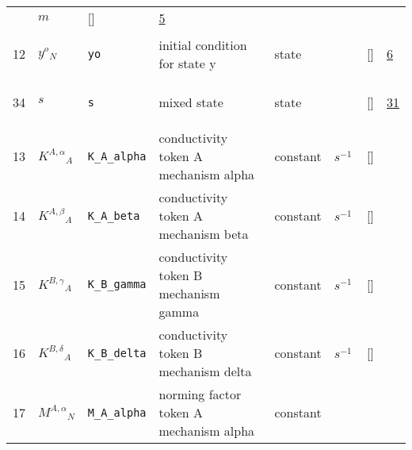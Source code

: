 \begin{longtable}{|p{1cm}|p{3cm}|p{3cm}|p{7cm}|p{3.0cm}|p{3cm}|p{2cm}|p{1cm}|}
             & $ m  $
             & []
             & \hyperlink{"e:5"}{ 5 }
                 \\
    12
             & \hypertarget{"v:12"}{ $ {{y^o}}{_{N}} $}
             & \verb|yo|
             & initial condition for state y
             & \begin{lay}state \end{lay}
             & $  $
             & []
             & \hyperlink{"e:6"}{ 6 }
                 \\
    34
             & \hypertarget{"v:34"}{ $ {s}{_{}} $}
             & \verb|s|
             & mixed state
             & \begin{lay}state \end{lay}
             & $  $
             & []
             & \hyperlink{"e:31"}{ 31 }
                 \\
    13
             & \hypertarget{"v:13"}{ $ {{K^{A,\alpha}}}{_{A}} $}
             & \verb|K_A_alpha|
             & conductivity token A mechanism alpha 
             & \begin{lay}constant \end{lay}
             & $ s^{-1} \, $
             & []
             & \\
    14
             & \hypertarget{"v:14"}{ $ {{K^{A,\beta}}}{_{A}} $}
             & \verb|K_A_beta|
             & conductivity token A mechanism beta
             & \begin{lay}constant \end{lay}
             & $ s^{-1} \, $
             & []
             & \\
    15
             & \hypertarget{"v:15"}{ $ {{K^{B,\gamma}}}{_{A}} $}
             & \verb|K_B_gamma|
             & conductivity token B mechanism gamma
             & \begin{lay}constant \end{lay}
             & $ s^{-1} \, $
             & []
             & \\
    16
             & \hypertarget{"v:16"}{ $ {{K^{B,\delta}}}{_{A}} $}
             & \verb|K_B_delta|
             & conductivity token B mechanism delta
             & \begin{lay}constant \end{lay}
             & $ s^{-1} \, $
             & []
             & \\
    17
             & \hypertarget{"v:17"}{ $ {{M^{A,\alpha}}}{_{N}} $}
             & \verb|M_A_alpha|
             & norming factor token A mechanism alpha
             & \begin{lay}constant \end{lay}

\end{longtable}
